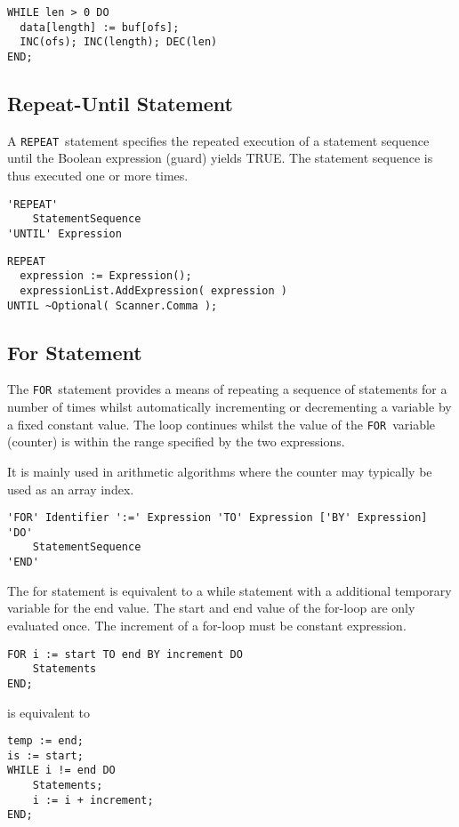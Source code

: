 \documentclass[a4wide,11pt]{article}
\newcommand{\FOR}{\lstinline"FOR"}
\newcommand{\REPEAT}{\lstinline"REPEAT"}
\begin{document}
\begin{annotation}
\begin{lstlisting}[style=example]
WHILE len > 0 DO
  data[length] := buf[ofs];
  INC(ofs); INC(length); DEC(len)
END;
\end{lstlisting}
\end{annotation}

\subsection{Repeat-Until Statement}
A \REPEAT\ statement specifies the repeated execution of a statement sequence until the Boolean expression (guard) yields TRUE.
The statement sequence is thus executed one or more times.

\begin{lstlisting}[style=ebnf]
'REPEAT'
    StatementSequence
'UNTIL' Expression
\end{lstlisting}

\begin{annotation}
\begin{lstlisting}[style=example]
REPEAT
  expression := Expression();
  expressionList.AddExpression( expression )
UNTIL ~Optional( Scanner.Comma );
\end{lstlisting}
\end{annotation}
\subsection{For Statement}
The \FOR\ statement provides a means of repeating a sequence of statements for a number of times whilst automatically incrementing or decrementing a variable by a fixed constant value.
The loop continues whilst the value of the \FOR\ variable (counter) is within the range specified by the two expressions.

It is mainly used in arithmetic algorithms where the counter may typically be used as an array index.

\begin{lstlisting}[style=ebnf]
'FOR' Identifier ':=' Expression 'TO' Expression ['BY' Expression] 'DO'
    StatementSequence
'END'
\end{lstlisting}

The for statement is equivalent to a while statement with a additional temporary variable for the end value.
The start and end value of the for-loop are only evaluated once.
The increment of a for-loop must be constant expression.

\begin{lstlisting}[style=example]
FOR i := start TO end BY increment DO
	Statements
END;
\end{lstlisting}
is equivalent to
\begin{lstlisting}[style=example]
temp := end;
is := start;
WHILE i != end DO
	Statements;
	i := i + increment;
END;
\end{lstlisting}
\end{document}
